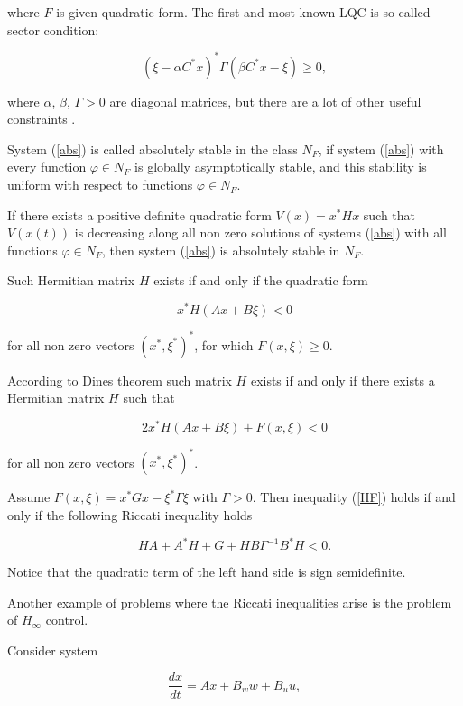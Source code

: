 \documentclass[11pt, reqno]{amsart}
\theoremstyle{plain}
\begin{document}
\noindent where $F$ is given quadratic form. The first and most known LQC is so-called sector condition:

$$ (\xi-\alpha C^{*}x)^{*}\Gamma (\beta C^{*}x-\xi)\ge 0,$$

\noindent where $\alpha$, $\beta$, $\Gamma>0$ are diagonal matrices, but there are a lot of other useful constraints \cite{frequencydomain}. 

System (\ref{abs}) is called absolutely stable in the class $N_{F}$, if system (\ref{abs}) with every function $\varphi\in N_{F}$ is globally asymptotically stable, and this stability is uniform with respect to functions $\varphi\in N_{F}$.

If there exists a positive definite quadratic form $V(x)=x^{*}Hx$ such that $V(x(t))$ is decreasing along all non zero solutions of systems (\ref{abs}) with all functions $\varphi\in N_{F}$, then system (\ref{abs}) is absolutely stable in $N_{F}$. 

Such Hermitian matrix $H$ exists if and only if the quadratic form

$$ x^{*}H(Ax+B\xi) <0 $$

\noindent for all non zero vectors $(x^{*},\xi^{*})^{*}$, for which $F(x,\xi)\ge 0$. 

According to Dines theorem such matrix $H$ exists if and only if there exists a Hermitian matrix $H$ such that

\begin{equation}\label{HF} 2x^{*}H(Ax+B\xi) + F(x,\xi) < 0
\end{equation}

\noindent for all non zero vectors $(x^{*},\xi^{*})^{*}$.

Assume $F(x,\xi)=x^{*}Gx-\xi^{*}\Gamma\xi$ with $\Gamma>0$. Then inequality (\ref{HF}) holds if and only if the following Riccati inequality holds

\begin{equation}\label{ric}
 HA + A^{*}H + G + HB\Gamma^{-1}B^{*}H < 0.
\end{equation}

Notice that the quadratic term of the left hand side is sign semidefinite.

Another example of problems where the Riccati inequalities arise is the problem of $H_{\infty}$ control.

Consider system

\begin{equation}\label{hinf}
\frac{dx}{dt} = Ax + B_{w}w + B_{u}u,
\end{equation}
\end{document}
